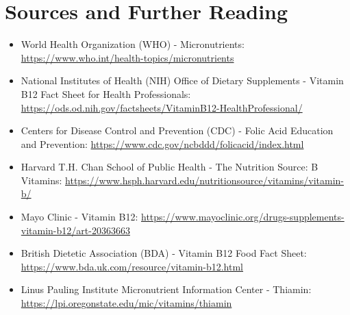 \section*{Sources and Further Reading}
\begin{itemize}
    \item World Health Organization (WHO) - Micronutrients: \url{https://www.who.int/health-topics/micronutrients}
    \item National Institutes of Health (NIH) Office of Dietary Supplements - Vitamin B12 Fact Sheet for Health Professionals: \url{https://ods.od.nih.gov/factsheets/VitaminB12-HealthProfessional/}
    \item Centers for Disease Control and Prevention (CDC) - Folic Acid Education and Prevention: \url{https://www.cdc.gov/ncbddd/folicacid/index.html}
    \item Harvard T.H. Chan School of Public Health - The Nutrition Source: B Vitamins: \url{https://www.hsph.harvard.edu/nutritionsource/vitamins/vitamin-b/}
    \item Mayo Clinic - Vitamin B12: \url{https://www.mayoclinic.org/drugs-supplements-vitamin-b12/art-20363663}
    \item British Dietetic Association (BDA) - Vitamin B12 Food Fact Sheet: \url{https://www.bda.uk.com/resource/vitamin-b12.html}
    \item Linus Pauling Institute Micronutrient Information Center - Thiamin: \url{https://lpi.oregonstate.edu/mic/vitamins/thiamin}
\end{itemize}